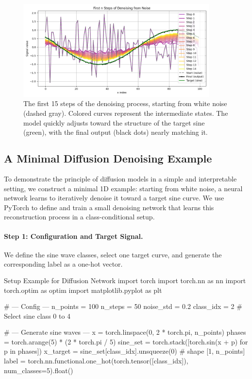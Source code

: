 %
\begin{figure}[htbp]
    \centering
    \includegraphics[width=0.9\textwidth]{images/diffusion_denoising.png}
    \caption{%
        The first 15 steps of the denoising process, starting from white noise (dashed gray).
        Colored curves represent the intermediate states.
        The model quickly adjusts toward the structure of the target sine (green),
        with the final output (black dots) nearly matching it.
    }
    \label{fig:diffusion_denoising}
\end{figure}



\subsection{A Minimal Diffusion Denoising Example}

To demonstrate the principle of diffusion models in a simple and interpretable setting, we construct a minimal 1D example: starting from white noise, a neural network learns to iteratively denoise it toward a target sine curve. We use PyTorch to define and train a small denoising network that learns this reconstruction process in a class-conditional setup.

%
\paragraph{Step 1: Configuration and Target Signal.} We define the sine wave classes, select one target curve, and generate the corresponding label as a one-hot vector.

\begin{codeonly}{Setup Example for Diffusion Network}
import torch
import torch.nn as nn
import torch.optim as optim
import matplotlib.pyplot as plt

# --- Config ---
n_points = 100
n_steps = 50
noise_std = 0.2
class_idx = 2  # Select sine class 0 to 4

# --- Generate sine waves ---
x = torch.linspace(0, 2 * torch.pi, n_points)
phases = torch.arange(5) * (2 * torch.pi / 5)
sine_set = torch.stack([torch.sin(x + p) for p in phases])
x_target = sine_set[class_idx].unsqueeze(0)  # shape [1, n_points]
label = torch.nn.functional.one_hot(torch.tensor([class_idx]), num_classes=5).float()
\end{codeonly}

